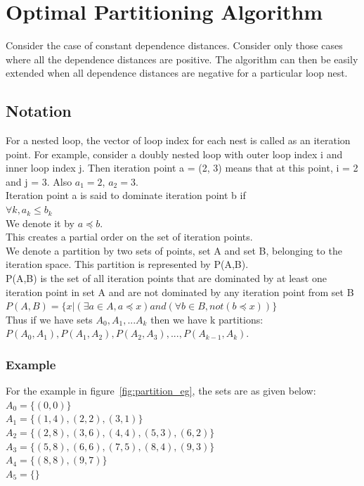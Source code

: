\chapter{Optimal Partitioning Algorithm}
Consider the case of constant dependence distances. Consider only those cases where all the dependence distances are positive. The algorithm can then be easily extended when all dependence distances are negative for a particular loop nest.
\section{Notation}
For a nested loop, the vector of loop index for each nest is called as an iteration point. For example, consider a doubly nested loop with outer loop index i and inner loop index j. Then iteration point a = (2, 3) means that at this point, i = 2 and j = 3. Also $a_1 = 2$, $a_2 = 3.$ \\

Iteration point a is said to dominate iteration point b if\\
 $ \forall k,  a_k \leq b_k$ \\
We denote it by $a \preceq b$.\\
This creates a partial order on the set of iteration points.\\

We denote a partition by two sets of points, set A and set B, belonging to the iteration space. This partition is represented by P(A,B). \\

P(A,B) is the set of all iteration points that are dominated by at least one iteration point in set A and are not dominated by any iteration point from set B \\
$P(A,B) = \{x | ( \exists a \in A, a \preceq x) and (\forall b \in B, not(b \preceq x))\}$ \\

Thus if we have sets $A_0, A_1, ... A_k$ then we have k partitions: \\
$P(A_0,A_1), P(A_1, A_2), P(A_2, A_3), ... , P(A_{k-1}, A_k)$. \\

\subsection{Example}

For the example in figure~\ref{fig:partition_eg}, the sets are as given below: \\
$A_0 = \{(0,0)\}$ \\
$A_1 = \{(1,4), (2,2), (3,1)\}$ \\
$A_2 = \{(2,8), (3,6), (4,4), (5,3), (6,2)\}$ \\
$A_3 = \{(5,8), (6,6), (7,5), (8,4), (9,3)\}$ \\
$A_4 = \{(8,8), (9,7)\}$ \\
$A_5 = \{\}$ \\

